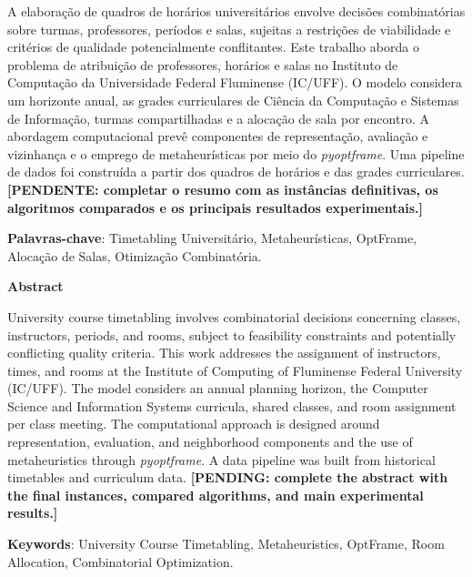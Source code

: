 \documentclass[12pt,a4paper]{article}
\newcommand{\pendente}[1]{\textbf{[PENDENTE: #1]}}
\begin{document}
A elaboração de quadros de horários universitários envolve decisões combinatórias sobre turmas, professores, períodos e salas, sujeitas a restrições de viabilidade e critérios de qualidade potencialmente conflitantes. Este trabalho aborda o problema de atribuição de professores, horários e salas no Instituto de Computação da Universidade Federal Fluminense (IC/UFF). O modelo considera um horizonte anual, as grades curriculares de Ciência da Computação e Sistemas de Informação, turmas compartilhadas e a alocação de sala por encontro. A abordagem computacional prevê componentes de representação, avaliação e vizinhança e o emprego de metaheurísticas por meio do \textit{pyoptframe}. Uma pipeline de dados foi construída a partir dos quadros de horários e das grades curriculares. \pendente{completar o resumo com as instâncias definitivas, os algoritmos comparados e os principais resultados experimentais.}

\vspace{0.5cm}
\noindent \textbf{Palavras-chave}: Timetabling Universitário, Metaheurísticas, OptFrame, Alocação de Salas, Otimização Combinatória.

\vspace{1.5cm}

\begin{center}
    \textbf{\large Abstract}
\end{center}
\vspace{0.5cm}

University course timetabling involves combinatorial decisions concerning classes, instructors, periods, and rooms, subject to feasibility constraints and potentially conflicting quality criteria. This work addresses the assignment of instructors, times, and rooms at the Institute of Computing of Fluminense Federal University (IC/UFF). The model considers an annual planning horizon, the Computer Science and Information Systems curricula, shared classes, and room assignment per class meeting. The computational approach is designed around representation, evaluation, and neighborhood components and the use of metaheuristics through \textit{pyoptframe}. A data pipeline was built from historical timetables and curriculum data. \textbf{[PENDING: complete the abstract with the final instances, compared algorithms, and main experimental results.]}

\vspace{0.5cm}
\noindent \textbf{Keywords}: University Course Timetabling, Metaheuristics, OptFrame, Room Allocation, Combinatorial Optimization.

\newpage
\tableofcontents
\newpage










\newpage


\end{document}
